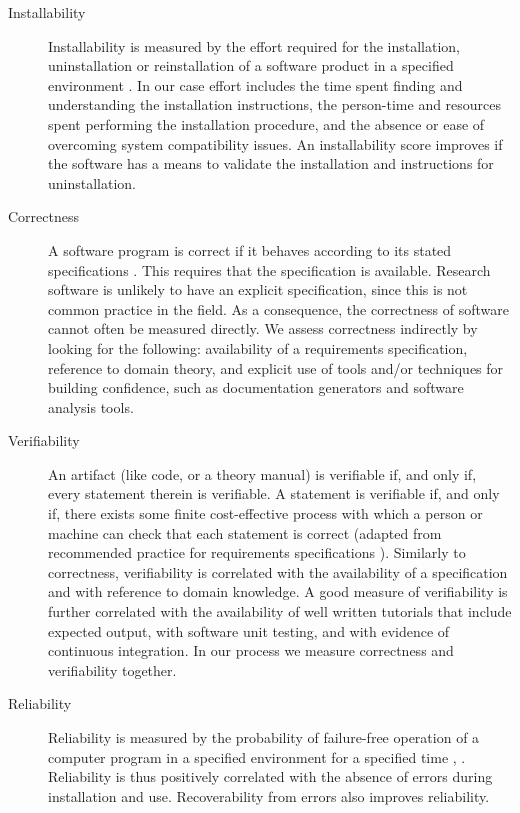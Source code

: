 \documentclass[final, 3p, times, authoryear]{elsarticle}
\begin{document}
\begin{description}

	\item[Installability] Installability is measured by the effort required for
	the installation, uninstallation or reinstallation of a software product in
	a specified environment \citep{ISO/IEC25010, lenhard2013measuring}. In our
	case effort includes the time spent finding and understanding the
	installation instructions, the person-time and resources spent performing
	the installation procedure, and the absence or ease of overcoming system
	compatibility issues. An installability score improves if the software has a
	means to validate the installation and instructions for uninstallation.
	
	\item[Correctness] A software program is correct if it behaves according to
	its stated specifications \citep[p.\ 17]{GhezziEtAl2003}. This requires that
	the specification is available. Research software is unlikely to have an
	explicit specification, since this is not common practice in the field. As a
	consequence, the correctness of software cannot often be measured directly.
	We assess correctness indirectly by looking for the following: availability
	of a requirements specification, reference to domain theory, and explicit
	use of tools and/or techniques for building confidence, such as
	documentation generators and software analysis tools.
	
	\item[Verifiability] An artifact (like code, or a theory manual) is
	verifiable if, and only if, every statement therein is verifiable. A
	statement is verifiable if, and only if, there exists some finite
	cost-effective process with which a person or machine can check that each
	statement is correct (adapted from recommended practice for requirements
	specifications \citep{IEEE1998}). Similarly to correctness, verifiability is
	correlated with the availability of a specification and with reference to
	domain knowledge. A good measure of verifiability is further correlated with
	the availability of well written tutorials that include expected output,
	with software unit testing, and with evidence of continuous integration. In
	our process we measure correctness and verifiability together.
	
	\item[Reliability] Reliability is measured by the probability of
	failure-free operation of a computer program in a specified environment for
	a specified time \citep[p.\ 357]{GhezziEtAl2003}, \citep{musa1987software}.
	Reliability is thus positively correlated with the absence of errors during
	installation and use. Recoverability from errors also improves reliability.
	

\end{description}
\end{document}
